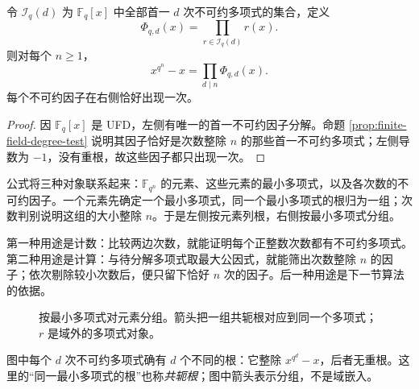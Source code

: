 \documentclass[lang=cn,a4paper,fontset=none,zihao=false,10pt,openany,twoside]{beautybook}
\numberwithin{algorithm}{chapter}
\begin{document}
\begin{theorem}[按次数收集全部不可约多项式]\label{thm:finite-field-product}
令 $\mathcal I_q(d)$ 为 $\mathbb F_q[x]$ 中全部首一 $d$ 次不可约多项式的集合，定义
\[
 \Phi_{q,d}(x)=\prod_{r\in\mathcal I_q(d)}r(x).
\]
则对每个 $n\ge1$，
\[
 x^{q^n}-x=\prod_{d\mid n}\Phi_{q,d}(x).
\]
每个不可约因子在右侧恰好出现一次。
\end{theorem}
\begin{proof}
因 $\mathbb F_q[x]$ 是 UFD，左侧有唯一的首一不可约因子分解。命题 \ref{prop:finite-field-degree-test} 说明其因子恰好是次数整除 $n$ 的那些首一不可约多项式；左侧导数为 $-1$，没有重根，故这些因子都只出现一次。
\end{proof}
\begin{remark}[这条乘积公式解决什么问题]
公式将三种对象联系起来：$\mathbb F_{q^n}$ 的元素、这些元素的最小多项式，以及各次数的不可约因子。一个元素先确定一个最小多项式，同一个最小多项式的根归为一组；次数判别说明这组的大小整除 $n$。于是左侧按元素列根，右侧按最小多项式分组。

第一种用途是计数：比较两边次数，就能证明每个正整数次数都有不可约多项式。第二种用途是计算：与待分解多项式取最大公因式，就能筛出次数整除 $n$ 的因子；依次剔除较小次数后，便只留下恰好 $n$ 次的因子。后一种用途是下一节算法的依据。
\end{remark}

\begin{figure}[H]
\centering
{}
\caption{按最小多项式对元素分组。箭头把一组共轭根对应到同一个多项式；$r$ 是域外的多项式对象。}
\label{fig:finite-field-root-groups}
\end{figure}
图中每个 $d$ 次不可约多项式确有 $d$ 个不同的根：它整除 $x^{q^d}-x$，后者无重根。这里的“同一最小多项式的根”也称\emph{共轭根}；图中箭头表示分组，不是域嵌入。
\end{document}
